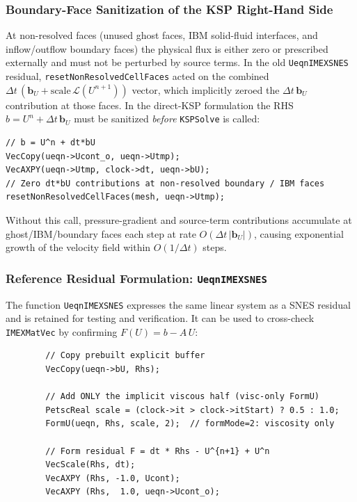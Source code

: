 \documentclass[12pt,a4paper]{article}
\newcommand{\cL}{\mathcal{L}}
\newcommand{\dt}{\Delta t}
\begin{document}
	\subsubsection{Boundary-Face Sanitization of the KSP Right-Hand Side}
	\label{sec:imexrhs}

	At non-resolved faces (unused ghost faces, IBM solid-fluid interfaces,
	and inflow/outflow boundary faces) the physical flux is either zero or
	prescribed externally and must not be perturbed by source terms.
	In the old \texttt{UeqnIMEXSNES} residual,
	\texttt{resetNonResolvedCellFaces} acted on the combined
	$\dt\,(\bm{b}_U + \text{scale}\,\cL(U^{n+1}))$ vector, which implicitly
	zeroed the $\dt\,\bm{b}_U$ contribution at those faces.
	In the direct-KSP formulation the RHS $b = U^n + \dt\,\bm{b}_U$
	must be sanitized \emph{before} \texttt{KSPSolve} is called:

	\begin{lstlisting}
// b = U^n + dt*bU
VecCopy(ueqn->Ucont_o, ueqn->Utmp);
VecAXPY(ueqn->Utmp, clock->dt, ueqn->bU);
// Zero dt*bU contributions at non-resolved boundary / IBM faces
resetNonResolvedCellFaces(mesh, ueqn->Utmp);
	\end{lstlisting}

	\begin{warnbox}
		Without this call, pressure-gradient and source-term contributions
		accumulate at ghost/IBM/boundary faces each step at rate
		$O(\dt\,|\bm{b}_U|)$, causing exponential growth of the velocity
		field within $O(1/\dt)$ steps.
	\end{warnbox}

	\subsubsection{Reference Residual Formulation: \texttt{UeqnIMEXSNES}}

	The function \texttt{UeqnIMEXSNES} expresses the same linear system
	as a SNES residual and is retained for testing and verification.
	It can be used to cross-check \texttt{IMEXMatVec} by confirming
	$F(U) = b - A\,U$:

	\begin{lstlisting}
		// Copy prebuilt explicit buffer
		VecCopy(ueqn->bU, Rhs);

		// Add ONLY the implicit viscous half (visc-only FormU)
		PetscReal scale = (clock->it > clock->itStart) ? 0.5 : 1.0;
		FormU(ueqn, Rhs, scale, 2);  // formMode=2: viscosity only

		// Form residual F = dt * Rhs - U^{n+1} + U^n
		VecScale(Rhs, dt);
		VecAXPY (Rhs, -1.0, Ucont);
		VecAXPY (Rhs,  1.0, ueqn->Ucont_o);
	\end{lstlisting}
\end{document}
